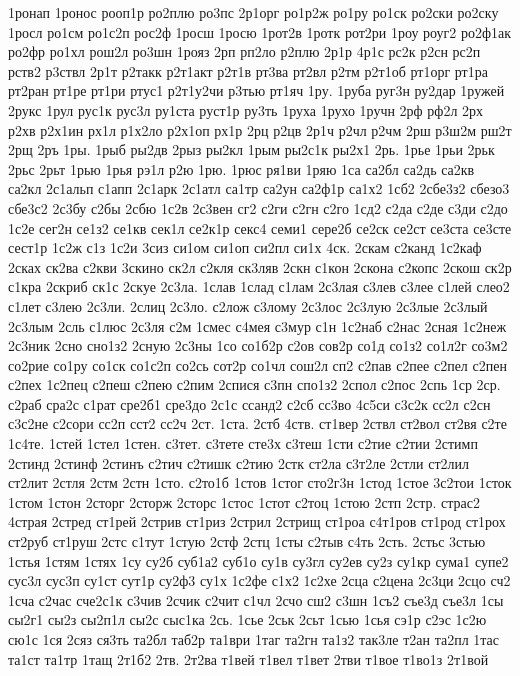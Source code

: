 {1ронап
1ронос
рооп1р
ро2плю
ро3пс
2р1орг
ро1р2ж
ро1ру
ро1ск
ро2ски
ро2ску
1росл
ро1см
ро1с2п
рос2ф
1росш
1росю
1рот2в
1ротк
рот2ри
1роу
роуг2
ро2ф1ак
ро2фр
ро1хл
рош2л
ро3шн
1рояз
2рп
рп2ло
р2плю
2р1р
4р1с
рс2к
р2сн
рс2п
рств2
р3ствл
2р1т
р2такк
р2т1акт
р2т1в
рт3ва
рт2вл
р2тм
р2т1об
рт1орг
рт1ра
рт2ран
рт1ре
рт1ри
ртус1
р2т1у2чи
р3тью
рт1яч
1ру.
1руба
руг3н
ру2дар
1ружей
2рукс
1рул
рус1к
рус3л
ру1ста
руст1р
ру3ть
1руха
1рухо
1ручн
2рф
рф2л
2рх
р2хв
р2х1ин
рх1л
р1х2ло
р2х1оп
рх1р
2рц
р2цв
2р1ч
р2чл
р2чм
2рш
р3ш2м
рш2т
2рщ
2ръ
1ры.
1рыб
ры2дв
2рыз
ры2кл
1рым
ры2с1к
ры2х1
2рь.
1рье
1рьи
2рьк
2рьс
2рьт
1рью
1рья
рэ1л
р2ю
1рю.
1рюс
ря1ви
1ряю
1са
са2бл
са2дь
са2кв
са2кл
2с1альп
с1апп
2с1арк
2с1атл
са1тр
са2ун
са2ф1р
са1х2
1сб2
2сбе3з2
сбезо3
сбе3с2
2с3бу
с2бы
2сбю
1с2в
2с3вен
сг2
с2ги
с2гн
с2го
1сд2
с2да
с2де
с3ди
с2до
1с2е
сег2н
се1з2
се1кв
сек1л
се2к1р
секс4
семи1
сере2б
се2ск
се2ст
се3ста
се3сте
сест1р
1с2ж
с1з
1с2и
3сиз
си1ом
си1оп
си2пл
си1х
4ск.
2скам
с2канд
1с2каф
2сках
ск2ва
с2кви
3скино
ск2л
с2кля
ск3ляв
2скн
с1кон
2скона
с2копс
2скош
ск2р
с1кра
2скриб
ск1с
2скуе
2с3ла.
1слав
1слад
с1лам
2с3лая
с3лев
с3лее
с1лей
слео2
с1лет
с3лею
2с3ли.
2слиц
2с3ло.
с2лож
с3лому
2с3лос
2с3лую
2с3лые
2с3лый
2с3лым
2сль
с1люс
2с3ля
с2м
1смес
с4мея
с3мур
с1н
1с2наб
с2нас
2сная
1с2неж
2с3ник
2сно
сно1з2
2сную
2с3ны
1со
со1б2р
с2ов
сов2р
со1д
со1з2
со1л2г
со3м2
со2рие
со1ру
со1ск
со1с2п
со2сь
сот2р
со1чл
сош2л
сп2
с2пав
с2пее
с2пел
с2пен
с2пех
1с2пец
с2пеш
с2пею
с2пим
2спися
с3пн
спо1з2
2спол
с2пос
2спь
1ср
2ср.
с2раб
сра2с
с1рат
сре2б1
сре3до
2с1с
ссанд2
с2сб
сс3во
4с5си
с3с2к
сс2л
с2сн
с3с2не
с2сори
сс2п
сст2
сс2ч
2ст.
1ста.
2стб
4ств.
ст1вер
2ствл
ст2вол
ст2вя
с2те
1с4те.
1стей
1стел
1стен.
с3тет.
с3тете
сте3х
с3теш
1сти
с2тие
с2тии
2стимп
2стинд
2стинф
2стинъ
с2тич
с2тишк
с2тию
2стк
ст2ла
с3т2ле
2стли
ст2лил
ст2лит
2стля
2стм
2стн
1сто.
с2то1б
1стов
1стог
сто2г3н
1стод
1стое
3с2тои
1сток
1стом
1стон
2сторг
2сторж
2сторс
1стос
1стот
с2тоц
1стою
2стп
2стр.
страс2
4страя
2стред
ст1рей
2стрив
ст1риз
2стрил
2стрищ
ст1роа
с4т1ров
ст1род
ст1рох
ст2руб
ст1руш
2стс
с1тут
1стую
2стф
2стц
1сты
с2тыв
с4ть
2сть.
2стьс
3стью
1стья
1стям
1стях
1су
су2б
суб1а2
суб1о
су1в
су3гл
су2ев
су2з
су1кр
сума1
супе2
сус3л
сус3п
су1ст
сут1р
су2ф3
су1х
1с2фе
с1х2
1с2хе
2сца
с2цена
2с3ци
2сцо
сч2
1сча
с2час
сче2с1к
с3чив
2счик
с2чит
с1чл
2счо
сш2
с3шн
1съ2
съе3д
съе3л
1сы
сы2г1
сы2з
сы2п1л
сы2с
сыс1ка
2сь.
1сье
2ськ
2сьт
1сью
1сья
сэ1р
с2эс
1с2ю
сю1с
1ся
2сяз
ся3ть
та2бл
таб2р
та1ври
1таг
та2гн
та1з2
так3ле
т2ан
та2пл
1тас
та1ст
та1тр
1тащ
2т1б2
2тв.
2т2ва
т1вей
т1вел
т1вет
2тви
т1вое
т1во1з
2т1вой
}
